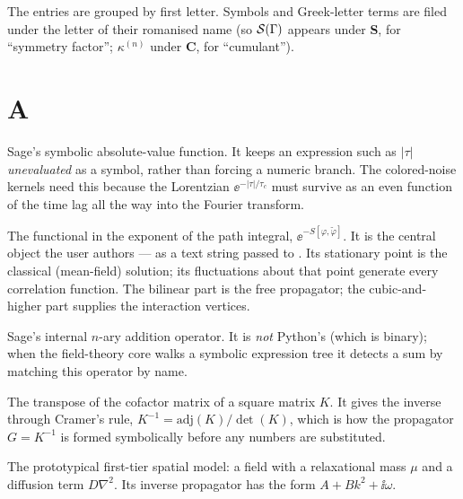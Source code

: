 The entries are grouped by first letter. Symbols and Greek-letter terms are
filed under the letter of their romanised name (so $\mathcal{S}(\Gamma)$ appears under
\textbf{S}, for ``symmetry factor''; $\kappa^{(n)}$ under \textbf{C}, for
``cumulant'').

\section*{A}
\begin{description}[leftmargin=0pt,style=nextline]

  \item[\code{abs\_symbolic}] Sage's symbolic absolute-value function. It keeps an
        expression such as $|\tau|$ \emph{unevaluated} as a symbol, rather than
        forcing a numeric branch. The colored-noise kernels need this because the
        Lorentzian $\ee^{-|\tau|/\tau_c}$ must survive as an even function of the
        time lag all the way into the Fourier transform.

  \item[Action $S$] The functional in the exponent of the \msrjd{} path integral,
        $\ee^{-S[\varphi,\tilde\varphi]}$. It is the central object the user
        authors --- as a text string passed to . Its
        stationary point is the classical (mean-field) solution; its fluctuations
        about that point generate every correlation function. The bilinear part is
        the free propagator; the cubic-and-higher part supplies the interaction
        vertices.

  \item[\code{add\_vararg}] Sage's internal $n$-ary addition operator. It is
        \emph{not} Python's  (which is binary); when the
        field-theory core walks a symbolic expression tree it detects a sum by
        matching this operator by name.

  \item[Adjugate $\mathrm{adj}(K)$] The transpose of the cofactor matrix of a
        square matrix $K$. It gives the inverse through Cramer's rule,
        $K^{-1}=\mathrm{adj}(K)/\det(K)$, which is how the propagator
        $G=K^{-1}$ is formed symbolically before any numbers are substituted.

  \item[Allen--Cahn / reaction--diffusion] The prototypical first-tier spatial
        model: a field with a relaxational mass $\mu$ and a diffusion term
        $D\nabla^{2}$. Its inverse propagator has the form $A + B k^{2} + \ii\omega$.


\end{description}
